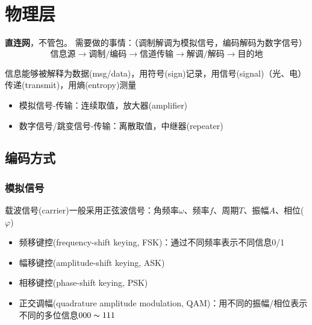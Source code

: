 
\section{物理层}
\textbf{直连网}，不管包。
需要做的事情：（调制解调为模拟信号，编码解码为数字信号）
\[\text{信息源}\to\text{调制/编码}\to\text{信道传输}\to\text{解调/解码}\to\text{目的地}\]

信息能够被解释为数据(msg/data)，用符号(sign)记录，用信号(signal)（光、电）传递(transmit)，用熵(entropy)测量
\begin{itemize}
	\item 模拟信号-传输：连续取值，放大器(amplifier)
	\item 数字信号/跳变信号-传输：离散取值，中继器(repeater)
\end{itemize}

\subsection{编码方式}
\subsubsection{模拟信号}
载波信号(carrier)一般采用正弦波信号：角频率$\omega$、频率$f$、周期$T$、振幅$A$、相位($\varphi$)
\begin{itemize}
	\item 频移键控(frequency-shift keying, FSK)：通过不同频率表示不同信息0/1
	\item 幅移键控(amplitude-shift keying, ASK)
	\item 相移键控(phase-shift keying, PSK)
	\item 正交调幅(quadrature amplitude modulation, QAM)：用不同的振幅/相位表示不同的多位信息$000\thicksim 111$
\end{itemize}

